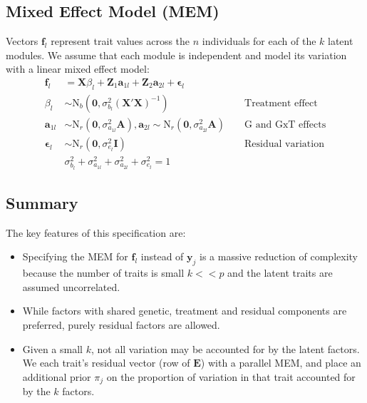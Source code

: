 \documentclass[landscape,a0paper,fontscale=0.35]{baposter}
\begin{document}
\begin{poster}
{\subsection*{Mixed Effect Model (MEM)}
Vectors $\mathbf{f}_l$ represent trait values across the $n$ individuals for each of the $k$ latent modules. We assume that each module is independent and model its variation with a linear mixed effect model:
\begin{align}
\mathbf{f}_{l} &= \mathbf{X} \beta_l + \mathbf{Z}_1 \mathbf{a}_{1l} + \mathbf{Z}_2 \mathbf{a}_{2l} + \mathbf{\epsilon}_l \\
\beta_l &\sim \mbox{N}_b(\mathbf{0},\sigma^2_{b_l} (\mathbf{X}'\mathbf{X})^{-1}) &&\mbox { Treatment effect} \nonumber \\
\mathbf{a}_{1l} &\sim \mbox{N}_r(\mathbf{0},\sigma^2_{a_{1l}} \mathbf{A}), \mathbf{a}_{2l} \sim \mbox{N}_r(\mathbf{0},\sigma^2_{a_{2l}} \mathbf{A}) 
	&&\mbox { G and GxT effects}  \nonumber \\
\mathbf{\epsilon}_l &\sim \mbox{N}_r(\mathbf{0},\sigma^2_{e_l} \mathbf{I}) &&\mbox { Residual variation}  \nonumber \\
&\sigma^2_{b_l} + \sigma^2_{a_{1l}} + \sigma^2_{a_{2l}} + \sigma^2_{e_l} = 1
\end{align}


\subsection*{Summary}
The key features of this specification are:
\begin{itemize}
\item Specifying the MEM for $\mathbf{f}_l$ instead of $\mathbf{y}_j$ is a massive reduction of complexity because the number of traits is small $k << p$ and the latent traits are assumed uncorrelated.
\item While factors with shared genetic, treatment and residual components are preferred, purely residual factors are allowed.
\item Given a small $k$, not all variation may be accounted for by the latent factors. We each trait's residual vector (row of $\mathbf{E}$) with a parallel MEM, and place an additional prior $\pi_j$ on the proportion of variation in that trait accounted for by the $k$ factors.
\end{itemize}
}
\end{poster}
\end{document}
